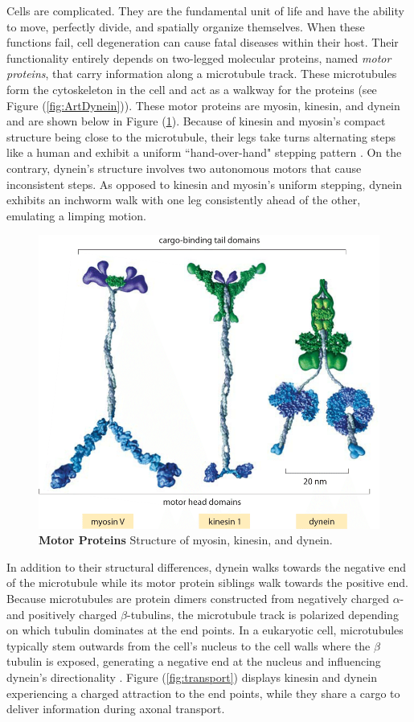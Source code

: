 Cells are complicated. They are the fundamental unit of life and have the ability to move, perfectly divide, and spatially organize themselves. When these functions fail, cell degeneration can cause fatal diseases within their host. Their functionality entirely depends on two-legged molecular proteins, named \textit{motor proteins}, that carry information along a microtubule track. These microtubules form the cytoskeleton in the cell and act as a walkway for the proteins (see Figure (\ref{fig:ArtDynein})). These motor proteins are myosin, kinesin, and dynein and are shown below in Figure (\ref{fig:Compare}). Because of kinesin and myosin's compact structure being close to the microtubule, their legs take turns alternating steps like a human and exhibit a uniform ``hand-over-hand" stepping pattern \cite{fehr2008kinesin}. On the contrary, dynein's structure involves two autonomous motors that cause inconsistent steps. As opposed to kinesin and myosin's uniform stepping, dynein exhibits an inchworm walk with one leg consistently ahead of the other, emulating a limping motion.

\begin{figure}[H]
	\centering
	\includegraphics[width=0.4\columnwidth]{Figures/motor_comparison.png}
	\caption[Motor Proteins]{\textbf{Motor Proteins} Structure of myosin, kinesin, and dynein. \cite{RonArt}}
	\label{fig:Compare}
\end{figure}

In addition to their structural differences, dynein walks towards the negative end of the microtubule while its motor protein siblings walk towards the positive end. Because microtubules are protein dimers constructed from negatively charged $\alpha$- and positively charged $\beta$-tubulins, the microtubule track is polarized depending on which tubulin dominates at the end points. In a eukaryotic cell, microtubules typically stem outwards from the cell's nucleus to the cell walls where the $\beta$ tubulin is exposed, generating a negative end at the nucleus and influencing dynein's directionality \cite{paschal1987retrograde}. Figure (\ref{fig:transport}) displays kinesin and dynein experiencing a charged attraction to the end points, while they share a cargo to deliver information during axonal transport. 

